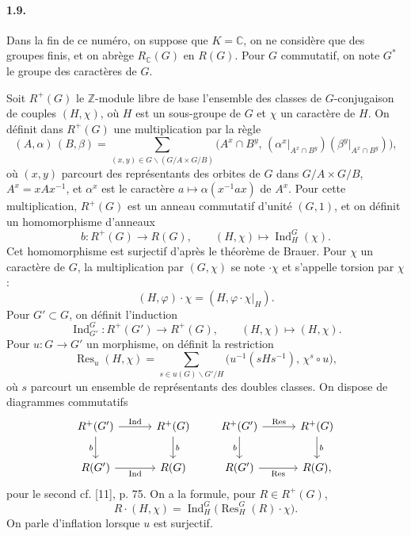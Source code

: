\documentclass[10pt]{article}
\newcommand{\C}{\mathbb C}
\newcommand{\Z}{\mathbb Z}
\newcommand{\Ind}{\operatorname{Ind}}
\newcommand{\Res}{\operatorname{Res}}
\providecommand{\Ind}{\operatorname{Ind}}
\begin{document}
\paragraph{1.9.} Dans la fin de ce numéro, on suppose que \(K=\C\), on ne considère que des groupes finis, et on abrège \(R_\C(G)\) en \(R(G)\). Pour \(G\) commutatif, on note \(G^*\) le groupe des caractères de \(G\).

Soit \(R^+(G)\) le \(\Z\)-module libre de base l'ensemble des classes de \(G\)-conjugaison de couples \((H,\chi)\), où \(H\) est un sous-groupe de \(G\) et \(\chi\) un caractère de \(H\). On définit dans \(R^+(G)\) une multiplication par la règle
\[
\tag{1.9.1}
(A,\alpha)\,(B,\beta)=
\sum_{(x,y)\in G\backslash(G/A\times G/B)}
\bigl(A^x\cap B^y,\,
(\alpha^x|_{A^x\cap B^y})(\beta^y|_{A^x\cap B^y})\bigr),
\]
où \((x,y)\) parcourt des représentants des orbites de \(G\) dans \(G/A\times G/B\), \(A^x=xAx^{-1}\), et \(\alpha^x\) est le caractère \(a\mapsto \alpha(x^{-1}ax)\) de \(A^x\). Pour cette multiplication, \(R^+(G)\) est un anneau commutatif d'unité \((G,1)\), et on définit un homomorphisme d'anneaux
\[
\tag{1.9.2}
b:R^+(G)\longrightarrow R(G),\qquad (H,\chi)\longmapsto \Ind_H^G(\chi).
\]
Cet homomorphisme est surjectif d'après le théorème de Brauer. Pour \(\chi\) un caractère de \(G\), la multiplication par \((G,\chi)\) se note \(\cdot\chi\) et s'appelle torsion par \(\chi\):
\[
\tag{1.9.3}
(H,\varphi)\cdot\chi=(H,\varphi\cdot\chi|_H).
\]
Pour \(G'\subset G\), on définit l'induction
\[
\tag{1.9.4}
\Ind_{G'}^G:R^+(G')\longrightarrow R^+(G),\qquad (H,\chi)\longmapsto(H,\chi).
\]
Pour \(u:G\to G'\) un morphisme, on définit la restriction
\[
\tag{1.9.5}
\Res_u(H,\chi)=
\sum_{s\in u(G)\backslash G'/H}
\bigl(u^{-1}(sHs^{-1}),\,\chi^s\circ u\bigr),
\]
où \(s\) parcourt un ensemble de représentants des doubles classes. On dispose de diagrammes commutatifs
\[
\begin{tikzcd}[column sep=3.0em,row sep=2.0em]
R^+(G') \arrow[r,"\Ind"] \arrow[d,"b"'] & R^+(G) \arrow[d,"b"]\\
R(G') \arrow[r,"\Ind"'] & R(G)
\end{tikzcd}
\qquad
\begin{tikzcd}[column sep=3.0em,row sep=2.0em]
R^+(G') \arrow[r,"\Res"] \arrow[d,"b"'] & R^+(G) \arrow[d,"b"]\\
R(G') \arrow[r,"\Res"'] & R(G),
\end{tikzcd}
\]
pour le second cf. [11], p. 75. On a la formule, pour \(R\in R^+(G)\),
\[
\tag{1.9.6}
R\cdot(H,\chi)=\Ind_H^G\bigl(\Res_H^G(R)\cdot\chi\bigr).
\]
On parle d'inflation lorsque \(u\) est surjectif.
\end{document}
